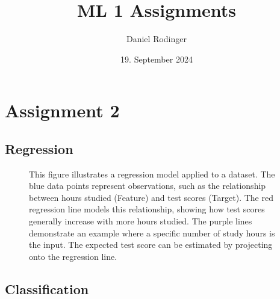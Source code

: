 \documentclass{article}
\title{ML 1 Assignments}
\author{Daniel Rodinger}
\date{19. September 2024}
\begin{document}
\maketitle
\newpage 

\section{Assignment 2}
\subsection{Regression}
\begin{figure}[h]
\centering
{}
    \caption{This figure illustrates a regression model applied to a dataset. The blue data points represent observations, such as the relationship between hours studied (Feature) and test scores (Target). The red regression line models this relationship, showing how test scores generally increase with more hours studied. The purple lines demonstrate an example where a specific number of study hours is the input. The expected test score can be estimated by projecting onto the regression line.}
    \label{fig:regression_example}
\end{figure}


\subsection{Classification}
\end{document}

